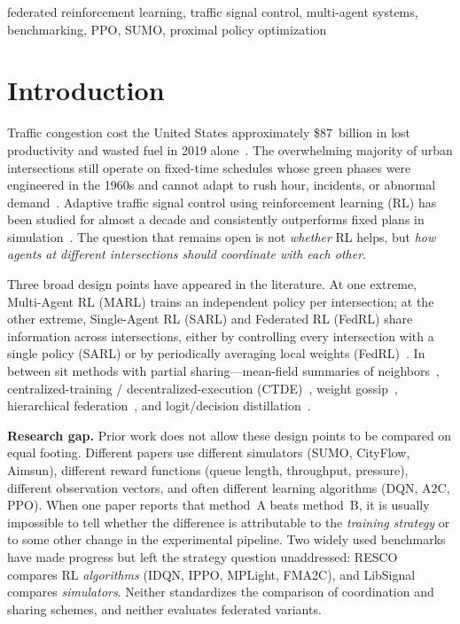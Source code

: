 \documentclass[conference]{IEEEtran}
\begin{document}
\begin{IEEEkeywords}
federated reinforcement learning, traffic signal control, multi-agent systems, benchmarking, PPO, SUMO, proximal policy optimization
\end{IEEEkeywords}

\section{Introduction}\label{sec:intro}
Traffic congestion cost the United States approximately \$87~billion in lost productivity and wasted fuel in 2019 alone~\cite{inrix2019}. The overwhelming majority of urban intersections still operate on fixed-time schedules whose green phases were engineered in the 1960s and cannot adapt to rush hour, incidents, or abnormal demand~\cite{wei2020survey}. Adaptive traffic signal control using reinforcement learning (RL) has been studied for almost a decade and consistently outperforms fixed plans in simulation~\cite{wei2020survey,ault2021resco}. The question that remains open is not \emph{whether} RL helps, but \emph{how agents at different intersections should coordinate with each other}.

Three broad design points have appeared in the literature. At one extreme, Multi-Agent RL (MARL) trains an independent policy per intersection; at the other extreme, Single-Agent RL (SARL) and Federated RL (FedRL) share information across intersections, either by controlling every intersection with a single policy (SARL) or by periodically averaging local weights (FedRL)~\cite{ye2021fedlight,hudson2022seal}. In between sit methods with partial sharing---mean-field summaries of neighbors~\cite{yang2018meanfield}, centralized-training / decentralized-execution (CTDE)~\cite{lowe2017maddpg}, weight gossip~\cite{koloskova2020gossip}, hierarchical federation~\cite{fu2025hierfed}, and logit/decision distillation~\cite{jeong2018feddistill}.

\textbf{Research gap.} Prior work does not allow these design points to be compared on equal footing. Different papers use different simulators (SUMO, CityFlow, Aimsun), different reward functions (queue length, throughput, pressure), different observation vectors, and often different learning algorithms (DQN, A2C, PPO). When one paper reports that method~A beats method~B, it is usually impossible to tell whether the difference is attributable to the \emph{training strategy} or to some other change in the experimental pipeline. Two widely used benchmarks have made progress but left the strategy question unaddressed: RESCO~\cite{ault2021resco} compares RL \emph{algorithms} (IDQN, IPPO, MPLight, FMA2C), and LibSignal~\cite{mei2024libsignal} compares \emph{simulators}. Neither standardizes the comparison of coordination and sharing schemes, and neither evaluates federated variants.
\end{document}
